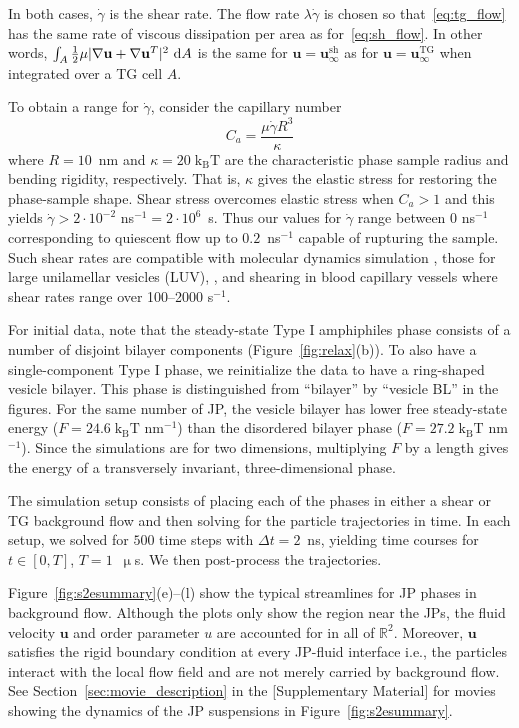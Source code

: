\documentclass[prb,preprint,showpacs,preprintnumbers,amsmath,amssymb,longbibliography]{revtex4-2}
\newcommand{\uu}{\mathbf{u}}
\newcommand{\kbt}{\mathrm{k}_{\text{B}}\mathrm{T}}
\begin{document}
In both cases, $\dot \gamma$ is the shear rate. The flow rate $\lambda
\dot \gamma$ is chosen so that~\eqref{eq:tg_flow} has the same rate of
viscous dissipation per area as for~\eqref{eq:sh_flow}. In other words,
$\int_{A} \frac{1}{2}\mu |\nabla \uu + \nabla \uu^T|^2 \,\dif A$ is the
same for $\uu = \uu_{\infty}^{\text{sh}}$ as for $\uu =
\uu_{\infty}^{\text{TG}}$ when integrated over a TG cell $A$. 

To obtain a range for $\dot \gamma$, consider the capillary number 
\begin{equation}
\label{eq:capillary}
C_a = \frac{\mu \dot \gamma R^3}{\kappa}
\end{equation}
where $R = 10$~nm and $\kappa = 20\;\kbt$ are the characteristic phase
sample radius and bending rigidity, respectively. That is, $\kappa$
gives the elastic stress for restoring the phase-sample shape. Shear
stress overcomes elastic stress when $C_a > 1$ and this yields $\dot
\gamma > 2 \cdot 10^{-2}$ ns$^{-1} = 2 \cdot 10^6$~s. Thus our values
for $\dot \gamma$ range between $0$ ns$^{-1}$ corresponding to quiescent
flow up to $0.2$~ns$^{-1}$ capable of rupturing the sample. Such shear
rates are compatible with molecular dynamics simulation
\cite{Brandner2019}, those for large unilamellar vesicles (LUV),
\cite{Bernard2005ShearinducedPA}, and shearing in blood capillary
vessels \cite{Cho2011} where shear rates range over 100--2000 s$^{-1}$.

For initial data, note that the steady-state Type I amphiphiles phase
consists of a number of disjoint bilayer components
(Figure~\ref{fig:relax}(b)). To also have a single-component Type I
phase, we reinitialize the data to have a ring-shaped vesicle bilayer.
This phase is distinguished from ``bilayer'' by ``vesicle BL'' in the
figures. For the same number of JP, the vesicle bilayer has lower free
steady-state energy ($F = 24.6 \;\kbt$ nm$^{-1}$) than the disordered
bilayer phase ($F = 27.2 \;\kbt$ nm$^{-1}$). Since the simulations are
for two dimensions, multiplying $F$ by a length gives the energy of a
transversely invariant, three-dimensional phase.

The simulation setup consists of placing each of the phases in either a
shear or TG background flow and then solving for the particle
trajectories in time. In each setup, we solved for $500$ time steps with
$\Delta t = 2$~ns, yielding time courses for $t \in [0, T]$, $T =
1$~$\upmu$s. We then post-process the trajectories.

Figure~\ref{fig:s2esummary}(e)--(l) show the typical streamlines for JP
phases in background flow. Although the plots only show the region near
the JPs, the fluid velocity $\uu$ and order parameter $u$ are accounted
for in all of $\mathbb{R}^2$. Moreover, $\uu$ satisfies the rigid
boundary condition at every JP-fluid interface i.e., the particles
interact with the local flow field and are not merely carried by
background flow. See Section~\ref{sec:movie_description} in the
[Supplementary Material] for movies showing the dynamics of the JP
suspensions in Figure~\ref{fig:s2esummary}.
\end{document}
